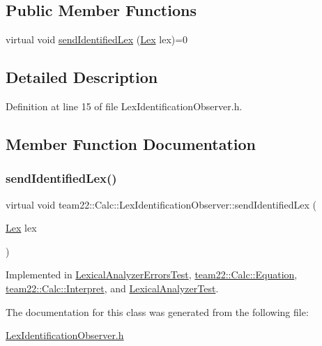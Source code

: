 \subsection*{Public Member Functions}
\begin{DoxyCompactItemize}
\item 
virtual void \hyperlink{classteam22_1_1_calc_1_1_lex_identification_observer_ac139f75c560625ec6fdb2e34cf0d4884}{send\+Identified\+Lex} (\hyperlink{classteam22_1_1_calc_1_1_lex}{Lex} lex)=0
\end{DoxyCompactItemize}


\subsection{Detailed Description}


Definition at line 15 of file Lex\+Identification\+Observer.\+h.



\subsection{Member Function Documentation}
\mbox{\label{classteam22_1_1_calc_1_1_lex_identification_observer_ac139f75c560625ec6fdb2e34cf0d4884}} 
\subsubsection{\texorpdfstring{send\+Identified\+Lex()}{sendIdentifiedLex()}}
{\footnotesize\ttfamily virtual void team22\+::\+Calc\+::\+Lex\+Identification\+Observer\+::send\+Identified\+Lex (\begin{DoxyParamCaption}\item[{\hyperlink{classteam22_1_1_calc_1_1_lex}{Lex}}]{lex }\end{DoxyParamCaption})\hspace{0.3cm}{\ttfamily [pure virtual]}}



Implemented in \hyperlink{struct_lexical_analyzer_errors_test_ac943a4238a0eb77957e2027740603c44}{Lexical\+Analyzer\+Errors\+Test}, \hyperlink{classteam22_1_1_calc_1_1_equation_ad5768951865500ec7fc514f676de2851}{team22\+::\+Calc\+::\+Equation}, \hyperlink{classteam22_1_1_calc_1_1_interpret_a479c65c010f4ef1060049b684e5f7eb6}{team22\+::\+Calc\+::\+Interpret}, and \hyperlink{struct_lexical_analyzer_test_a1c412feae956dcdc6ca0519e361e8f64}{Lexical\+Analyzer\+Test}.



The documentation for this class was generated from the following file\+:\begin{DoxyCompactItemize}
\item 
\hyperlink{_lex_identification_observer_8h}{Lex\+Identification\+Observer.\+h}\end{DoxyCompactItemize}
